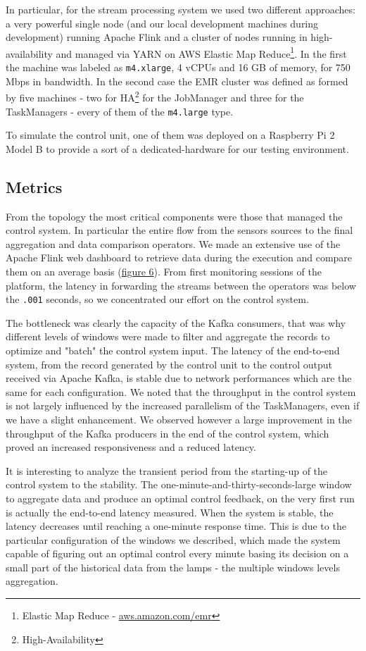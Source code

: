 In particular, for the stream processing system we used two different approaches: a very powerful single node (and our local development machines during development) running Apache Flink and a cluster of nodes running in high-availability and managed via YARN on AWS Elastic Map Reduce\footnote{Elastic Map Reduce - \url{aws.amazon.com/emr}}. In the first the machine was labeled as \texttt{m4.xlarge}, 4 vCPUs and 16 GB of memory, for 750 Mbps in bandwidth. In the second case the EMR cluster was defined as formed by five machines - two for HA\footnote{High-Availability} for the JobManager and three for the TaskManagers -  every of them of the \texttt{m4.large} type.

To simulate the control unit, one of them was deployed on a Raspberry Pi 2 Model B to provide a sort of a dedicated-hardware for our testing environment.

\subsection{Metrics}
From the topology the most critical components were those that managed the control system. In particular the entire flow from the sensors sources to the final aggregation and data comparison operators. We made an extensive use of the Apache Flink web dashboard to retrieve data during the execution and compare them on an average basis (\hyperref[fig:ember_metrics]{figure 6}). From first monitoring sessions of the platform, the latency in forwarding the streams between the operators was below the \texttt{.001} seconds, so we concentrated our effort on the control system. 

The bottleneck was clearly the capacity of the Kafka consumers, that was why different levels of windows were made to filter and aggregate the records to optimize and "batch" the control system input. The latency of the end-to-end system, from the record generated by the control unit to the control output received via Apache Kafka, is stable due to network performances which are the same for each configuration. We noted that the throughput in the control system is not largely influenced by the increased parallelism of the TaskManagers, even if we have a slight enhancement. We observed however a large improvement in the throughput of the Kafka producers in the end of the control system, which proved an increased responsiveness and a reduced latency. 

It is interesting to analyze the transient period from the starting-up of the control system to the stability. The one-minute-and-thirty-seconds-large window to aggregate data and produce an optimal control feedback, on the very first run is actually the end-to-end latency measured. When the system is stable, the latency decreases until reaching a one-minute response time. This is due to the particular configuration of the windows we described, which made the system capable of figuring out an optimal control every minute basing its decision on a small part of the historical data from the lamps - the multiple windows levels aggregation.

